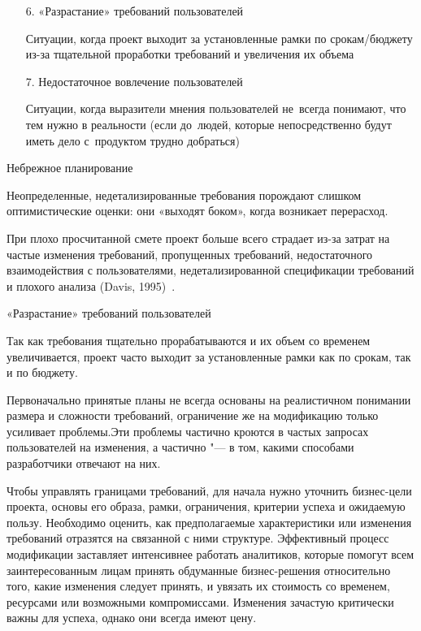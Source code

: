 \documentclass{../industrial-development}
\begin{document}
{\begin{frame}
\begin{itemize}
{\small Ситуации, возникающие из-за плохо просчитанной сметы, когда проект страдает из-за затрат на частые изменения требований, недетализированной спецификации}

\item[6.] «Разрастание» требований пользователей

{\small Ситуации, когда проект выходит за установленные рамки по срокам/бюджету из-за тщательной проработки требований и увеличения их объема}

\item[7.] Недостаточное вовлечение пользователей

{\small Ситуации, когда выразители мнения пользователей не~всегда понимают, что тем нужно в реальности (если до~людей, которые непосредственно будут иметь дело с~продуктом трудно добраться)}


\end{itemize}
\end{frame}

\lecturenotes

\alert{Небрежное планирование}

Неопределенные, недетализированные требования порождают слишком оптимистические оценки: они «выходят боком», когда возникает перерасход.

При плохо просчитанной смете проект больше всего страдает из-за затрат на частые изменения требований, пропущенных требований, недостаточного взаимодействия с пользователями, недетализированной спецификации требований и плохого
анализа (Davis, 1995)~\cite[с.~20]{Wiegers}.

\alert{«Разрастание» требований пользователей}

Так как требования тщательно прорабатываются и их объем со временем увеличивается, проект часто выходит за установленные рамки как по срокам, так и по бюджету. 

Первоначально принятые планы не всегда основаны на реалистичном понимании размера и сложности требований, ограничение же на модификацию только усиливает проблемы.Эти проблемы частично кроются в частых запросах пользователей на изменения, а частично "--- в том, какими способами разработчики отвечают на них.

Чтобы управлять границами требований, для начала нужно уточнить бизнес-цели проекта, основы его образа, рамки, ограничения, критерии успеха и ожидаемую пользу. Необходимо оценить, как предполагаемые характеристики или изменения требований отразятся на связанной с ними структуре. Эффективный процесс модификации заставляет интенсивнее работать аналитиков, которые помогут всем заинтересованным лицам принять обдуманные бизнес-решения относительно того, какие изменения следует принять, и увязать их стоимость со временем, ресурсами или возможными компромиссами. Изменения зачастую критически важны для успеха, однако они всегда имеют цену.

}
\end{document}
